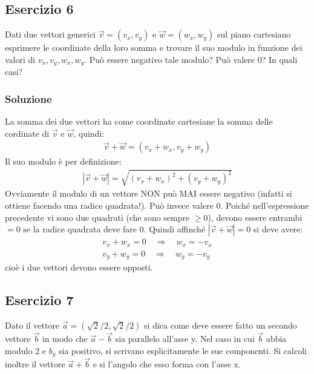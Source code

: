 \documentclass[12pt,a4paper]{book}
\begin{document}
\subsection*{Esercizio 6}
Dati due vettori generici $\vec{v}=(v_x, v_y)$ e $\vec{w}=(w_x, w_y)$ sul piano cartesiano esprimere le coordinate della loro somma e trovare il suo modulo in funzione dei valori di $v_x, v_y, w_x, w_y$. Può essere negativo tale modulo? Può valere 0? In quali casi? 
\subsubsection*{Soluzione}
La somma dei due vettori ha come coordinate cartesiane la somma delle cordinate di $\vec{v}$ e $\vec{w}$, quindi:
\begin{gather*}
\vec{v}+\vec{w}=(v_x+w_x, v_y+w_y)
\end{gather*}
Il suo modulo è per definizione:
\begin{gather*}
|\vec{v}+\vec{w}|=\sqrt{(v_x+w_x)^2 + (v_y+w_y)^2}
\end{gather*}
Ovviamente il modulo di un vettore NON può MAI essere negativo (infatti si ottiene facendo una radice quadrata!). Può invece valere $0$. Poiché nell'espressione precedente vi sono due quadrati (che sono sempre $\geq0$), devono essere entrambi $=0$ se la radice quadrata deve fare $0$. Quindi affinché $|\vec{v}+\vec{w}|=0$ si deve avere:
\begin{gather*}
v_x+w_x=0 \quad \Rightarrow \quad w_x=-v_x \\
v_y+w_y=0 \quad \Rightarrow \quad w_y=-v_y
\end{gather*}
cioè i due vettori devono essere opposti. 

\subsection*{Esercizio 7}
Dato il vettore $\vec{a}=(\sqrt{2}/2, \sqrt{2}/2)$ si dica come deve essere fatto un secondo vettore $\vec{b}$ in modo che $\vec{a}-\vec{b}$ sia parallelo all'asse y. Nel caso in cui $\vec{b}$ abbia modulo 2 e $b_y$ sia positivo, si scrivano esplicitamente le sue componenti. Si calcoli inoltre il vettore $\vec{a}+\vec{b}$ e si l'angolo che esso forma con l'asse x. 
\end{document}

